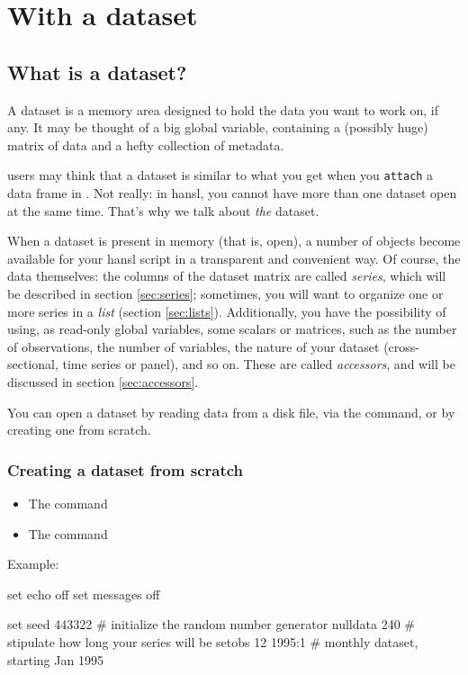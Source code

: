 \part{With a dataset}
\label{part:hp-data}

\chapter{What is a dataset?}

A dataset is a memory area designed to hold the data you want to work
on, if any. It may be thought of a big global variable, containing a
(possibly huge) matrix of data and a hefty collection of metadata.

 users may think that a dataset is similar to what you get when
you \texttt{attach} a data frame in . Not really: in hansl, you
cannot have more than one dataset open at the same time. That's why we
talk about \emph{the} dataset.

When a dataset is present in memory (that is, open), a number of
objects become available for your hansl script in a transparent and
convenient way. Of course, the data themselves: the columns of the
dataset matrix are called \emph{series}, which will be described in
section \ref{sec:series}; sometimes, you will want to organize one or
more series in a \emph{list} (section \ref{sec:lists}). Additionally,
you have the possibility of using, as read-only global variables, some
scalars or matrices, such as the number of observations, the number of
variables, the nature of your dataset (cross-sectional, time series or
panel), and so on. These are called \emph{accessors}, and will be
discussed in section \ref{sec:accessors}.

You can open a dataset by reading data from a disk file, via the
 command, or by creating one from scratch.

\section{Creating a dataset from scratch}
\begin{itemize}
\item The  command
\item The  command
\end{itemize}

Example:
\begin{code}
set echo off
set messages off

set seed 443322           # initialize the random number generator
nulldata 240              # stipulate how long your series will be
setobs 12 1995:1          # monthly dataset, starting Jan 1995   
\end{code}


